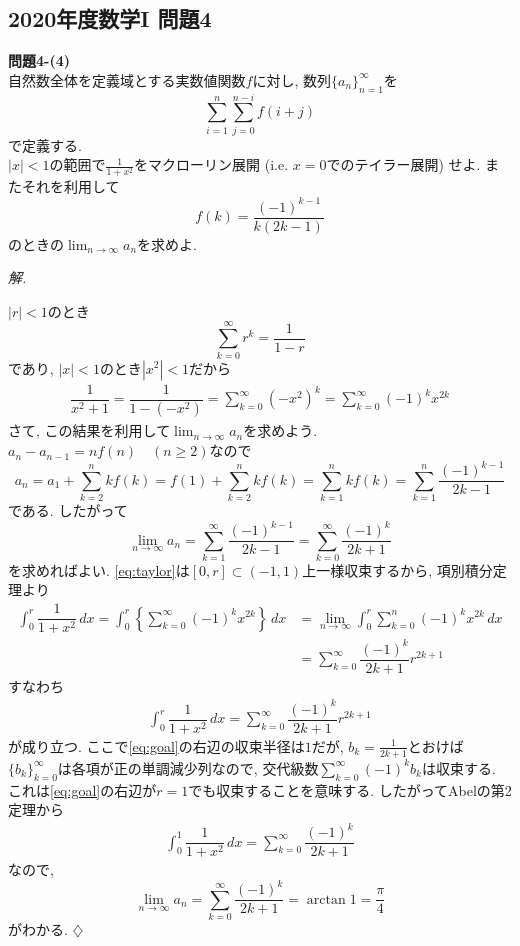 \documentclass[titlepage]{jsarticle}
\numberwithin{equation}{section}
\newenvironment{kaitou}[1][解]{%
\begin{proofbox}%
\textit{#1. }\ignorespaces
}{%
\hfill$\diamondsuit$%
\end{proofbox}%
}
\begin{document}
\subsection{2020年度数学I 問題4}
\begin{problem}
\textbf{問題4-(4)}\\
自然数全体を定義域とする実数値関数$f$に対し, 数列$\{a_n\}_{n = 1}^\infty$を
\[
\sum_{i = 1}^n\sum_{j = 0}^{n - i} f(i + j)
\]
で定義する. \\
$|x| < 1$の範囲で$\frac{1}{1 + x ^2}$をマクローリン展開 (i.e. $x = 0$でのテイラー展開) せよ. またそれを利用して
\[
f(k) = \frac{(-1)^{k-1}}{k(2k - 1)}
\]
のときの$\displaystyle{\lim_{n \to \infty} a_n}$を求めよ.
\end{problem}
\begin{kaitou}
$|r| < 1$のとき
\[
\sum_{k=0}^\infty r^k = \dfrac{1}{1 - r}
\]
であり, $|x| < 1$のとき$|x^2| < 1$だから
\begin{align}
\dfrac{1}{x^2 + 1} = \dfrac{1}{1 - (-x^2)} = \sum_{k = 0}^\infty (-x^2)^k =  \boxed{\sum_{k = 0}^\infty (-1)^k x^{2k}} \label{eq:taylor}
\end{align}
さて, この結果を利用して$\displaystyle{\lim_{n \to \infty} a_n}$を求めよう. $a_n - a_{n-1} = nf(n)\quad(n \ge 2)$なので
\[
a_n = a_1 + \sum_{k= 2}^n kf(k) = f(1) + \sum_{k= 2}^n kf(k) = \sum_{k = 1}^n kf(k) = \sum_{k = 1}^n \dfrac{(-1)^{k-1}}{2k - 1}
\]
である. したがって
\[
\lim_{n \to \infty} a_n = \sum_{k = 1}^\infty \dfrac{(-1)^{k-1}}{2k - 1} = \sum_{k = 0}^\infty \dfrac{(-1)^k}{2k+1} 
\]
を求めればよい. \eqref{eq:taylor}は$[0, r] \subset (-1, 1)$上一様収束するから, 項別積分定理より
\begin{align*}
\int_0^r \dfrac{1}{1 + x^2}\,dx = \int_0^r \left\{\sum_{k = 0}^\infty (-1)^k x^{2k}\right\}\,dx  & = \lim_{n \to \infty} \int_0^r \sum_{k = 0}^n (-1)^k x^{2k}\,dx\\
& = \sum_{k = 0}^\infty \dfrac{(-1)^k}{2k + 1}r^{2k + 1}
\end{align*}
すなわち
\begin{align}
\int_0^r \dfrac{1}{1 + x^2}\,dx = \sum_{k = 0}^\infty \dfrac{(-1)^k}{2k + 1}r^{2k + 1} \label{eq:goal}
\end{align}
が成り立つ. ここで\eqref{eq:goal}の右辺の収束半径は$1$だが, $b_k = \frac{1}{2k + 1}$とおけば$\{b_k\}_{k = 0}^\infty$は各項が正の単調減少列なので, 交代級数$\displaystyle{\sum_{k = 0} ^\infty(-1)^kb_k}$は収束する. これは\eqref{eq:goal}の右辺が$r = 1$でも収束することを意味する. したがってAbelの第2定理から
\begin{align*}
\int_0^1 \dfrac{1}{1 + x^2}\,dx = \sum_{k = 0}^\infty \dfrac{(-1)^k}{2k + 1}
\end{align*}
なので, 
\[
\lim_{n \to \infty} a_n = \sum_{k = 0}^\infty \dfrac{(-1)^k}{2k + 1} = \arctan 1 = \boxed{\frac{\pi}{4}}
\]
がわかる.
\end{kaitou}
\end{document}
